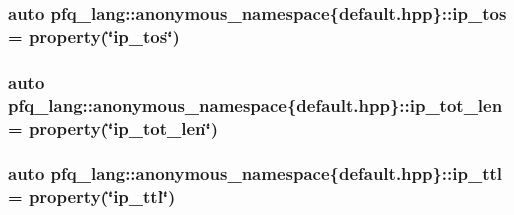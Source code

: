 \hypertarget{namespacepfq__lang_1_1anonymous__namespace_02default_8hpp_03_afc29e9877341008196788bba2bde3e04}{
\subsubsection[{ip\-\_\-tos}]{\setlength{\rightskip}{0pt plus 5cm}auto pfq\-\_\-lang\-::anonymous\-\_\-namespace\{default.\-hpp\}\-::ip\-\_\-tos = {\bf property}(\char`\"{}ip\-\_\-tos\char`\"{})}}\label{namespacepfq__lang_1_1anonymous__namespace_02default_8hpp_03_afc29e9877341008196788bba2bde3e04}
\hypertarget{namespacepfq__lang_1_1anonymous__namespace_02default_8hpp_03_a172d424ed5943dda09a80d7c63be9490}{
\subsubsection[{ip\-\_\-tot\-\_\-len}]{\setlength{\rightskip}{0pt plus 5cm}auto pfq\-\_\-lang\-::anonymous\-\_\-namespace\{default.\-hpp\}\-::ip\-\_\-tot\-\_\-len = {\bf property}(\char`\"{}ip\-\_\-tot\-\_\-len\char`\"{})}}\label{namespacepfq__lang_1_1anonymous__namespace_02default_8hpp_03_a172d424ed5943dda09a80d7c63be9490}
\hypertarget{namespacepfq__lang_1_1anonymous__namespace_02default_8hpp_03_a3fb042ff6cf76a1f01b4e97e35b30507}{
\subsubsection[{ip\-\_\-ttl}]{\setlength{\rightskip}{0pt plus 5cm}auto pfq\-\_\-lang\-::anonymous\-\_\-namespace\{default.\-hpp\}\-::ip\-\_\-ttl = {\bf property}(\char`\"{}ip\-\_\-ttl\char`\"{})}}\label{namespacepfq__lang_1_1anonymous__namespace_02default_8hpp_03_a3fb042ff6cf76a1f01b4e97e35b30507}
